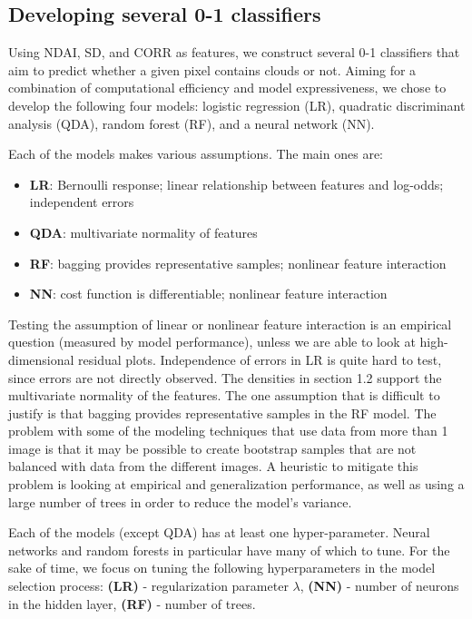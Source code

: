 \documentclass{article}\usepackage[]{graphicx}\usepackage[]{color}
\begin{document}
\subsection{Developing several 0-1 classifiers}

Using NDAI, SD, and CORR as features, we construct several 0-1 classifiers that
aim to predict whether a given pixel contains clouds or not. Aiming for a combination
of computational efficiency and model expressiveness, we chose to develop the following
four models: logistic regression (LR), quadratic discriminant analysis (QDA), 
random forest (RF), and a neural network (NN).

Each of the models makes various assumptions. The main ones are: 

\begin{itemize}
\item \textbf{LR}: Bernoulli response; linear relationship between features and log-odds; independent errors
\item \textbf{QDA}: multivariate normality of features
\item \textbf{RF}: bagging provides representative samples; nonlinear feature interaction
\item \textbf{NN}: cost function is differentiable; nonlinear feature interaction
\end{itemize}

Testing the assumption of linear or nonlinear feature interaction is an empirical question (measured by model performance), unless we are able to look at high-dimensional residual plots. 
Independence of errors in LR is quite hard to test, since errors are not directly observed.
The densities in section 1.2 support the multivariate normality of the features.
The one assumption that is difficult to justify is that bagging provides representative
samples in the RF model. The problem with some of the modeling techniques that use 
data from more than 1 image is that it may be possible to create bootstrap samples
that are not balanced with data from the different images. A heuristic to mitigate this problem
is looking at empirical and generalization performance, as well as using a large number 
of trees in order to reduce the model's variance. 

Each of the models (except QDA) has at least one hyper-parameter. Neural networks
and random forests in particular have many of which to tune. For the sake of time,
we focus on tuning the following hyperparameters in the model selection process:
\textbf{(LR)} - regularization parameter $\lambda$, \textbf{(NN)} - number of neurons in the
hidden layer, \textbf{(RF)} - number of trees.
\end{document}
